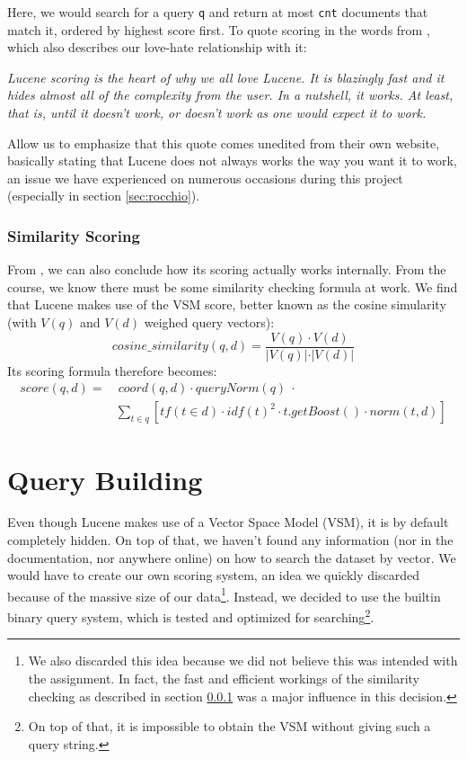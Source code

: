 \documentclass[11pt]{article}
\begin{document}
Here, we would search for a query \texttt{q} and return at most \texttt{cnt} documents that match it, ordered by highest score first. To quote scoring in the words from \cite{lucene}, which also describes our love-hate relationship with it:
\begin{displayquote}
    \textsl{Lucene scoring is the heart of why we all love Lucene. It is blazingly fast and it hides almost all of the complexity from the user. In a nutshell, it works. At least, that is, until it doesn't work, or doesn't work as one would expect it to work.}
\end{displayquote}

Allow us to emphasize that this quote comes unedited from their own website, basically stating that Lucene does not always works the way you want it to work, an issue we have experienced on numerous occasions during this project (especially in section \ref{sec:rocchio}).

\subsubsection{Similarity Scoring}\label{sec:ss}
From \cite{lucene}, we can also conclude how its scoring actually works internally. From the course, we know there must be some similarity checking formula at work. We find that Lucene makes use of the \textsf{VSM score}, better known as the \textsf{cosine simularity} (with $V(q)$ and $V(d)$ weighed query vectors):
$$cosine\_similarity(q, d) = \frac{V(q)\cdot V(d)}{\vert V(q)\vert\cdot\vert V(d)\vert}$$
Its scoring formula therefore becomes:
\begin{align*}
    score(q, d) =&\ coord(q, d)\cdot queryNorm(q)\ \cdot\\
    &\sum_{t \in q}\left[tf(t\in d)\cdot idf(t)^2 \cdot t.getBoost()\cdot norm(t, d)\right]
\end{align*}

\section{Query Building}\label{sec:query}
Even though Lucene makes use of a Vector Space Model (VSM), it is by default completely hidden. On top of that, we haven't found any information (nor in the documentation, nor anywhere online) on how to search the dataset by vector. We would have to create our own scoring system, an idea we quickly discarded because of the massive size of our data\footnote{We also discarded this idea because we did not believe this was intended with the assignment. In fact, the fast and efficient workings of the similarity checking as described in section \ref{sec:ss} was a major influence in this decision.}. Instead, we decided to use the builtin binary query system, which is tested and optimized for searching\footnote{On top of that, it is impossible to obtain the VSM without giving such a query string.}.
\end{document}

